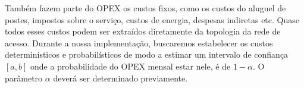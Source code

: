\documentclass[12pt]{article}
\begin{document}
Também fazem parte do OPEX os custos fixos, como os custos do aluguel de postes, impostos sobre o serviço, custos de energia, despesas indiretas etc. Quase todos esses custos podem ser extraídos diretamente da topologia da rede de acesso. Durante a nossa implementação, buscaremos estabelecer os custos determinísticos e probabilísticos de modo a estimar um intervalo de confiança $[a,b]$ onde a probabilidade do OPEX mensal estar nele, é de $1-\alpha$. O parâmetro $\alpha$ deverá ser determinado previamente.
\nocite{pon, optpon, optpon2}


\end{document}
